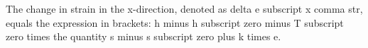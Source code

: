 The change in strain in the x-direction, denoted as delta e subscript x comma str, equals the expression in brackets: h minus h subscript zero minus T subscript zero times the quantity s minus s subscript zero plus k times e.